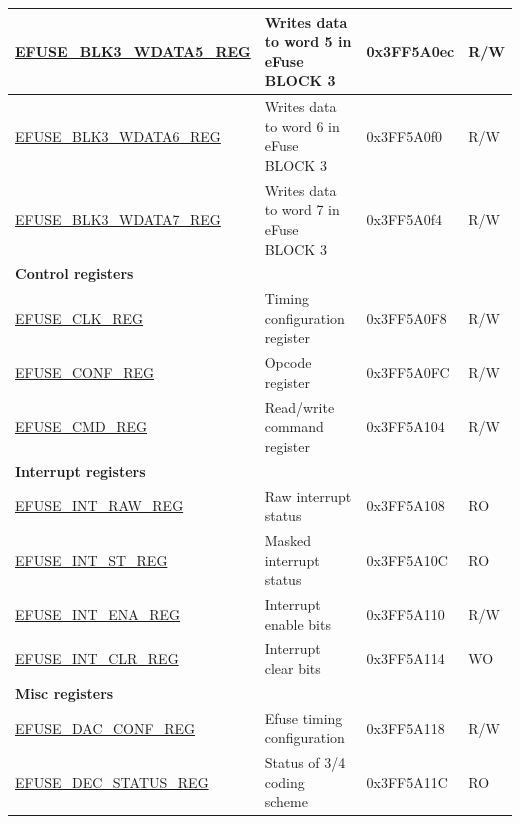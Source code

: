 \begin{longtable}{ | p{5cm} | p{7.5cm} | p{2cm} | p{1cm} | }
\hyperref[regdesc:EFUSEBLK3WDATAnREG]{EFUSE\_BLK3\_WDATA5\_REG} & Writes data to word 5 in eFuse BLOCK 3 & 0x3FF5A0ec & R/W \\ \hline
\hyperref[regdesc:EFUSEBLK3WDATAnREG]{EFUSE\_BLK3\_WDATA6\_REG} & Writes data to word 6 in eFuse BLOCK 3 & 0x3FF5A0f0 & R/W \\ \hline
\hyperref[regdesc:EFUSEBLK3WDATAnREG]{EFUSE\_BLK3\_WDATA7\_REG} & Writes data to word 7 in eFuse BLOCK 3 & 0x3FF5A0f4 & R/W \\ \hline
\multicolumn{4}{|l|}{\textbf{Control registers}} \\ \hline
\hyperref[regdesc:EFUSECLKREG]{EFUSE\_CLK\_REG} & Timing configuration register & 0x3FF5A0F8 & R/W \\ \hline
\hyperref[regdesc:EFUSECONFREG]{EFUSE\_CONF\_REG} & Opcode register & 0x3FF5A0FC & R/W \\ \hline
\hyperref[regdesc:EFUSECMDREG]{EFUSE\_CMD\_REG} & Read/write command register & 0x3FF5A104 & R/W \\ \hline
\multicolumn{4}{|l|}{\textbf{Interrupt registers}} \\ \hline
\hyperref[regdesc:EFUSEINTRAWREG]{EFUSE\_INT\_RAW\_REG} & Raw interrupt status & 0x3FF5A108 & RO \\ \hline
\hyperref[regdesc:EFUSEINTSTREG]{EFUSE\_INT\_ST\_REG} & Masked interrupt status & 0x3FF5A10C & RO \\ \hline
\hyperref[regdesc:EFUSEINTENAREG]{EFUSE\_INT\_ENA\_REG} & Interrupt enable bits & 0x3FF5A110 & R/W \\ \hline
\hyperref[regdesc:EFUSEINTCLRREG]{EFUSE\_INT\_CLR\_REG} & Interrupt clear bits & 0x3FF5A114 & WO \\ \hline
\multicolumn{4}{|l|}{\textbf{Misc registers}} \\ \hline
\hyperref[regdesc:EFUSEDACCONFREG]{EFUSE\_DAC\_CONF\_REG} & Efuse timing configuration & 0x3FF5A118 & R/W \\ \hline
\hyperref[regdesc:EFUSEDECSTATUSREG]{EFUSE\_DEC\_STATUS\_REG} & Status of 3/4 coding scheme & 0x3FF5A11C & RO \\ \hline
\end{longtable}
